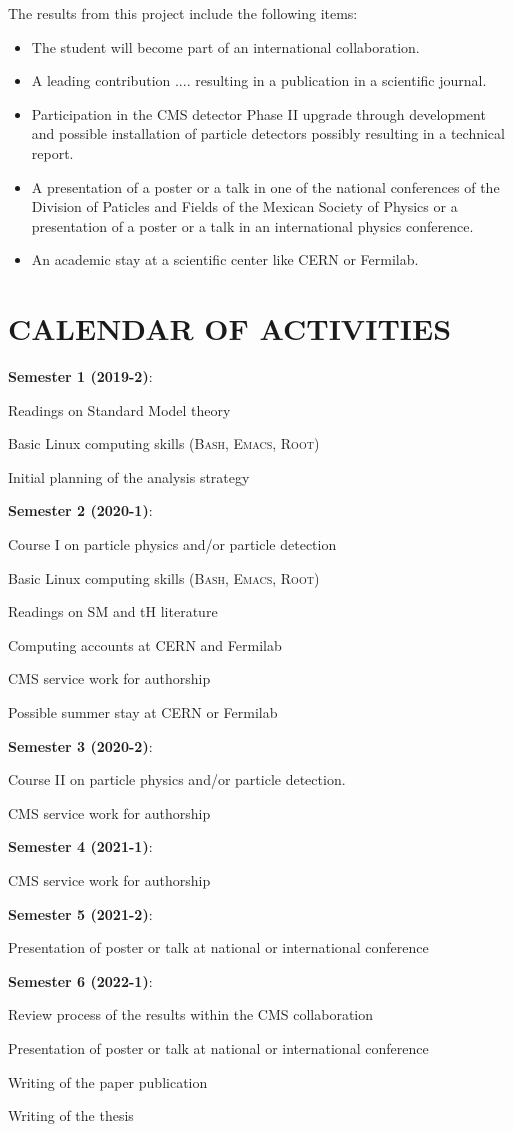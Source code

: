 \documentclass[final,12p]{article}
\newcommand{\SubItem}[1]{ {\setlength\itemindent{15pt} \item[-] #1} }
\begin{document}
The results from this project include the following items:
\begin{itemize}
\item The student will become part of an international collaboration.
\item A leading contribution ....  resulting in a publication in a scientific journal.
\item Participation in the CMS detector Phase II upgrade through development and possible installation of particle detectors possibly resulting in a technical report.
\item A presentation of a poster or a talk in one of the national conferences of the Division of Paticles and Fields of the Mexican Society of Physics or a presentation of a poster or a talk in an international physics conference.
\item An academic stay at a scientific center like CERN or Fermilab.
\end{itemize}



\section{CALENDAR OF ACTIVITIES}
\onehalfspacing
\begin{itemize}

\item {\bf Semester 1 (2019-2)}:
  \SubItem{ Readings on Standard Model theory}
  \SubItem{ Basic Linux computing skills (\textsc{Bash, Emacs, Root})}
  \SubItem{ Initial planning of the analysis strategy}

\item {\bf Semester 2 (2020-1)}:
  \SubItem{ Course I on particle physics and/or particle detection}
  \SubItem{ Basic Linux computing skills (\textsc{Bash, Emacs, Root})}
  \SubItem{ Readings on SM and tH literature}
  \SubItem{ Computing accounts at CERN and Fermilab}
  \SubItem{ CMS service work for authorship}
  \SubItem{ Possible summer stay at CERN or Fermilab}

\item {\bf Semester 3 (2020-2)}:
  \SubItem{ Course II on particle physics and/or particle detection.}
  \SubItem{ CMS service work for authorship}

\item {\bf Semester 4 (2021-1)}:
  \SubItem{ CMS service work for authorship}

\item {\bf Semester 5 (2021-2)}:
  \SubItem{ Presentation of poster or talk at national or international conference}

\item {\bf Semester 6 (2022-1)}:
  \SubItem{ Review process of the results within the CMS collaboration}
  \SubItem{ Presentation of poster or talk at national or international conference}
  \SubItem{ Writing of the paper publication}
  \SubItem{ Writing of the thesis}
\end{itemize}



\cleardoublepage
\onehalfspacing


\end{document}
